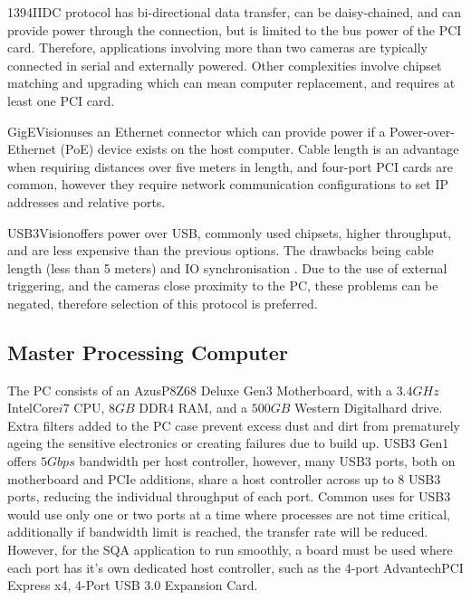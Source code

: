 \documentclass[fleqn,twoside,12pt]{report}
\begin{document}
1394IIDC protocol has bi-directional data transfer, can be daisy-chained, and can provide power through the connection, but is limited to the bus power of the PCI card. Therefore, applications involving more than two cameras are typically connected in serial and externally powered. Other complexities involve chipset matching and upgrading which can mean computer replacement, and requires at least one PCI card. 

GigEVision\textregistered uses an Ethernet connector which can provide power if a Power-over-Ethernet (PoE) device exists on the host computer. Cable length is an advantage when requiring distances over five meters in length, and four-port PCI cards are common, however they require network communication configurations to set IP addresses and relative ports.

USB3Vision\textregistered offers power over USB, commonly used chipsets, higher throughput, and are less expensive than the previous options. The drawbacks being cable length (less than 5 meters) and IO synchronisation \cite{camera_bus}. Due to the use of external triggering, and the cameras close proximity to the PC, these problems can be negated, therefore selection of this protocol is preferred.




\subsection{Master Processing Computer}

The PC consists of an Azus\textregistered P8Z68 Deluxe Gen3 Motherboard, with a $3.4GHz$ Intel\textregistered Core\texttrademark $i7$ CPU, $8GB$ DDR4 RAM, and a $500GB$ Western Digital\textregistered hard drive. Extra filters added to the PC case prevent excess dust and dirt from prematurely ageing the sensitive electronics or creating failures due to build up. USB3 Gen1 offers $5Gbps$ bandwidth per host controller, however, many USB3 ports, both on motherboard and PCIe additions, share a host controller across up to 8 USB3 ports, reducing the individual throughput of each port. Common uses for USB3 would use only one or two ports at a time where processes are not time critical, additionally if bandwidth limit is reached, the transfer rate will be reduced. However, for the SQA application to run smoothly, a board must be used where each port has it's own dedicated host controller, such as the 4-port Advantech\texttrademark PCI Express x4, 4-Port USB 3.0 Expansion Card. 
\end{document}
